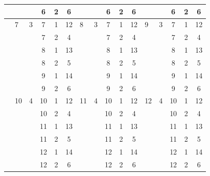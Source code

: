 \documentclass{cmspaper}
\begin{document}
\begin{table}[htb]
\begin{center}
\begin{tabular}{l|l|cccc|l|cccc|l|cccc}
    &   &   & 6 & 2 &  6 &    &   & 6 & 2&  6 &   &   & 6 & 2&  6 \\ \hline
    & 7 & 3 & 7 & 1 & 12 & 8  & 3 & 7 & 1& 12 & 9 & 3 & 7 & 1& 12 \\ \hline
    &   &   & 7 & 2 &  4 &    &   & 7 & 2&  4 &   &   & 7 & 2&  4 \\ \hline
    &   &   & 8 & 1 & 13 &    &   & 8 & 1& 13 &   &   & 8 & 1& 13 \\ \hline
    &   &   & 8 & 2 &  5 &    &   & 8 & 2&  5 &   &   & 8 & 2&  5 \\ \hline
    &   &   & 9 & 1 & 14 &    &   & 9 & 1& 14 &   &   & 9 & 1& 14 \\ \hline
    &   &   & 9 & 2 &  6 &    &   & 9 & 2&  6 &   &   & 9 & 2&  6 \\ \hline
    & 10& 4 & 10 & 1 & 12 & 11& 4 & 10& 1& 12 & 12& 4 & 10 & 1& 12 \\ \hline
    &   &   & 10 & 2 &  4 &    &  & 10& 2&  4 &   &   & 10 & 2&  4 \\ \hline
    &   &   & 11 & 1 & 13 &    &  & 11& 1& 13 &   &   & 11 & 1& 13 \\ \hline
    &   &   & 11 & 2 &  5 &    &  & 11& 2&  5 &   &   & 11 & 2&  5 \\ \hline
    &   &   & 12 & 1 & 14 &    &  & 12& 1& 14 &   &   & 12 & 1& 14 \\ \hline
    &   &   & 12 & 2 &  6 &    &  & 12& 2&  6 &   &   & 12 & 2&  6 \\ \hline
      \end{tabular}
    \end{center}
  \end{table}
\end{document}

